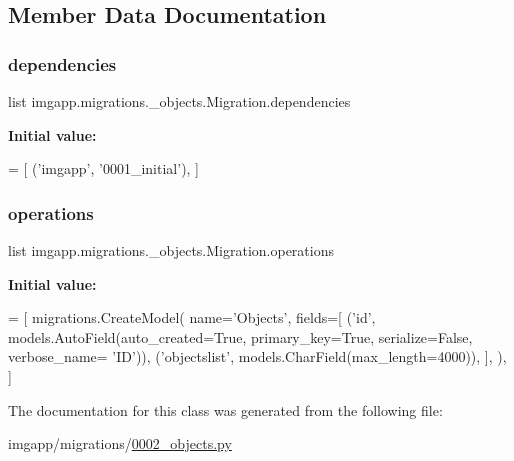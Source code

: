 \subsection{Member Data Documentation}
\mbox{\label{classimgapp_1_1migrations_1_10002__objects_1_1Migration_abd3fa170eb3a3149ee43f9acf33917b4}} 
\subsubsection{\texorpdfstring{dependencies}{dependencies}}
{\footnotesize\ttfamily list imgapp.\+migrations.\+\_\+objects.\+Migration.\+dependencies\hspace{0.3cm}{\ttfamily [static]}}

{\bfseries Initial value\+:}
\begin{DoxyCode}
=  [
        (\textcolor{stringliteral}{'imgapp'}, \textcolor{stringliteral}{'0001\_initial'}),
    ]
\end{DoxyCode}
\mbox{\label{classimgapp_1_1migrations_1_10002__objects_1_1Migration_adcbef6b10dcf430fa1e7ce7f4a9b700a}} 
\subsubsection{\texorpdfstring{operations}{operations}}
{\footnotesize\ttfamily list imgapp.\+migrations.\+\_\+objects.\+Migration.\+operations\hspace{0.3cm}{\ttfamily [static]}}

{\bfseries Initial value\+:}
\begin{DoxyCode}
=  [
        migrations.CreateModel(
            name=\textcolor{stringliteral}{'Objects'},
            fields=[
                (\textcolor{stringliteral}{'id'}, models.AutoField(auto\_created=\textcolor{keyword}{True}, primary\_key=\textcolor{keyword}{True}, serialize=\textcolor{keyword}{False}, verbose\_name=\textcolor{stringliteral}{
      'ID'})),
                (\textcolor{stringliteral}{'objectslist'}, models.CharField(max\_length=4000)),
            ],
        ),
    ]
\end{DoxyCode}


The documentation for this class was generated from the following file\+:\begin{DoxyCompactItemize}
\item 
imgapp/migrations/\hyperlink{0002__objects_8py}{0002\+\_\+objects.\+py}\end{DoxyCompactItemize}
